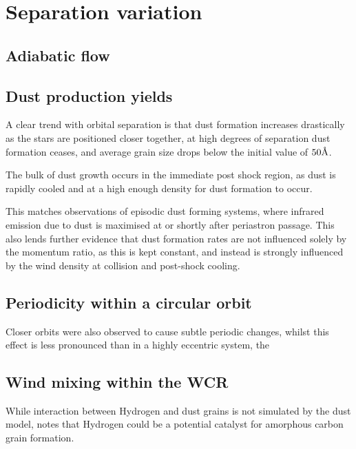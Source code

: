 \section{Separation variation}




\subsection{Adiabatic flow}


\subsection{Dust production yields}

A clear trend with orbital separation is that dust formation increases drastically as the stars are positioned closer together, at high degrees of separation dust formation ceases, and average grain size drops below the initial value of $50 \text \AA$.

The bulk of dust growth occurs in the immediate post shock region, as dust is rapidly cooled and at a high enough density for dust formation to occur.

This matches observations of episodic dust forming systems, where infrared emission due to dust is maximised at or shortly after periastron passage. This also lends further evidence that dust formation rates are not influenced solely by the momentum ratio, as this is kept constant, and instead is strongly influenced by the wind density at collision and post-shock cooling. 

\subsection{Periodicity within a circular orbit}

Closer orbits were also observed to cause subtle periodic changes, whilst this effect is less pronounced than in a highly eccentric system, the 


\subsection{Wind mixing within the WCR}


While interaction between Hydrogen and dust grains is not simulated by the dust model, \cite{leteuffModelDustFormation2002} notes that Hydrogen could be a potential catalyst for amorphous carbon grain formation.



